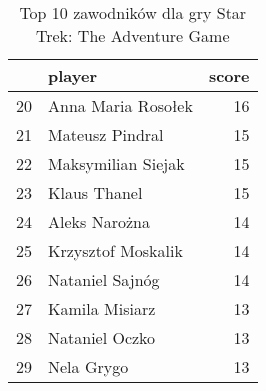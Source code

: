
\begin{table}[h]
\caption{Top 10 zawodników dla gry Star Trek: The Adventure Game}\label{tab:top10_3}
\centering
\begin{tabular}{rlr}
\hline
    & player             &   score \\
\hline
 20 & Anna Maria Rosołek &      16 \\
 21 & Mateusz Pindral    &      15 \\
 22 & Maksymilian Siejak &      15 \\
 23 & Klaus Thanel       &      15 \\
 24 & Aleks Narożna      &      14 \\
 25 & Krzysztof Moskalik &      14 \\
 26 & Nataniel Sajnóg    &      14 \\
 27 & Kamila Misiarz     &      13 \\
 28 & Nataniel Oczko     &      13 \\
 29 & Nela Grygo         &      13 \\
\hline
\end{tabular}
\end{table}
